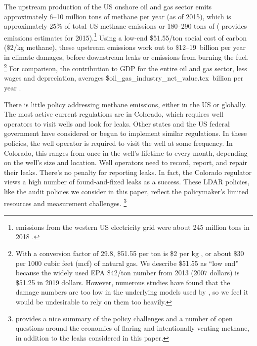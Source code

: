 \documentclass[12pt,oneside,letterpaper]{article}
\theoremstyle{definition}
\begin{document}
\begin{refsection}
The upstream production of the US onshore oil and gas sector emits approximately 6--10 million tons of methane per year (as of 2015), which is approximately
25\%
of total US methane emissions or 180--290 tons of 
(\cite{Alvarez/etal:2018} provides emissions estimates for 2015).\footnote{%
 emissions from the western US electricity grid were about 245 million tons in 2018
\parencite{epa-egrid-2018}.
}
Using a low-end \$51.55/ton social cost of carbon (\$2/kg methane), these upstream emissions work out to \$12--19~billion per year in climate damages, before downstream leaks or emissions from burning the fuel.%
\footnote{%
With a conversion factor of 29.8, \$51.55 per ton  is \$2 per kg , or about \$30 per 1000 cubic feet (mcf) of natural gas.
We describe \$51.55 as ``low end'' because the widely used \gls{EPA} \$42/ton number from 2013 (2007 dollars) is \$51.25 in 2019 dollars.
However, numerous studies have found that the damage numbers are too low in the underlying models used by \textcite{EPASCC:2016}, so we feel it would be undesirable to rely on them too heavily.
}
For comparison, the contribution to \gls{GDP} for the entire oil and gas sector, less wages and depreciation, averages
\${oil_gas_industry_net_value.tex}~billion per year
\parencite{bea_output, bea_depreciation}.


There is little policy addressing methane emissions, either in the US or globally.
The most active current regulations are in Colorado, which requires well operators to visit wells and look for leaks.
Other states and the US federal government have considered or begun to implement similar regulations.
In these policies, the well operator is required to visit the well at some frequency.
In Colorado, this ranges from once in the well's lifetime to every month, depending on the well's size and location.
Well operators need to record, report, and repair  their leaks.
There's no penalty for reporting leaks.
In fact, the Colorado regulator views a high number of found-and-fixed leaks as a success.
These \gls{LDAR} policies, like the audit policies we consider in this paper, reflect the policymaker's limited resources and measurement challenges.%
\footnote{%
\textcite{Agerton/Gilbert/Upton:2021} provides a nice summary of the policy challenges and a number of open questions around the economics of flaring and intentionally venting methane, in addition to the leaks considered in this paper.
}


\end{refsection}
\end{document}
